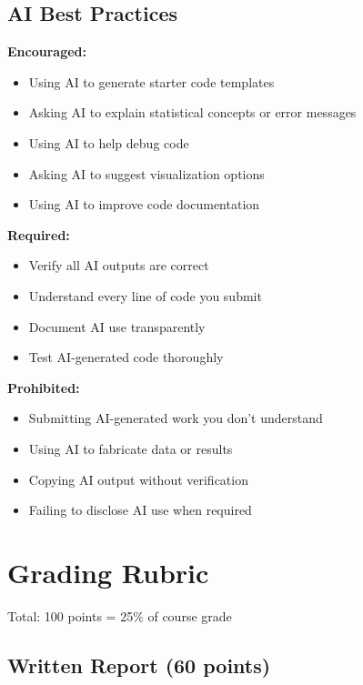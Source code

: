 \documentclass[11pt]{article}
\begin{document}
\subsection{AI Best Practices}

\begin{tcolorbox}[colback=aiblue!10,colframe=aiblue,title=AI Use Guidelines]

\textbf{Encouraged:}
\begin{itemize}
\item[+] Using AI to generate starter code templates
\item[+] Asking AI to explain statistical concepts or error messages
\item[+] Using AI to help debug code
\item[+] Asking AI to suggest visualization options
\item[+] Using AI to improve code documentation
\end{itemize}

\textbf{Required:}
\begin{itemize}
\item[\checkmark] Verify all AI outputs are correct
\item[\checkmark] Understand every line of code you submit
\item[\checkmark] Document AI use transparently
\item[\checkmark] Test AI-generated code thoroughly
\end{itemize}

\textbf{Prohibited:}
\begin{itemize}
\item[-] Submitting AI-generated work you don't understand
\item[-] Using AI to fabricate data or results
\item[-] Copying AI output without verification
\item[-] Failing to disclose AI use when required
\end{itemize}

\end{tcolorbox}

\section{Grading Rubric}

Total: 100 points = 25\% of course grade

\subsection{Written Report (60 points)}
\end{document}
